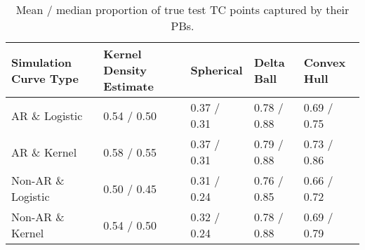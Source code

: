 \begin{table}[ht!]
\centering
\caption{Mean / median proportion of true test TC points captured by their PBs.} 
\label{tab:average_captured}
\begin{tabular}{R{1.5in}L{1.1in}L{.95in}L{.95in}L{.95in}}
  \hline
\hline
Simulation Curve Type & Kernel Density Estimate & Spherical & Delta Ball & Convex Hull \\ 
  \hline
AR \& Logistic & 0.54 / 0.50 & 0.37 / 0.31 & 0.78 / 0.88 & 0.69 / 0.75 \\ 
  AR \& Kernel & 0.58 / 0.55 & 0.37 / 0.31 & 0.79 / 0.88 & 0.73 / 0.86 \\ 
  Non-AR \& Logistic & 0.50 / 0.45 & 0.31 / 0.24 & 0.76 / 0.85 & 0.66 / 0.72 \\ 
  Non-AR \& Kernel & 0.54 / 0.50 & 0.32 / 0.24 & 0.78 / 0.88 & 0.69 / 0.79 \\ 
   \hline
\end{tabular}
\end{table}
